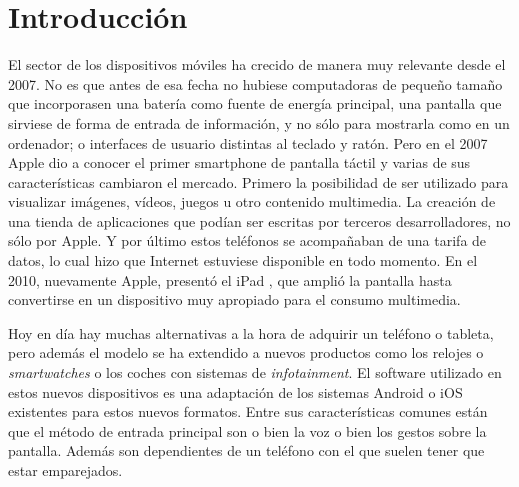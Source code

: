 \documentclass[
10pt, %
a4paper, %
oneside, %
headinclude,footinclude, %
BCOR5mm, %
]{scrartcl}
\begin{document}

{\let\thefootnote\relax{}}

{\let\thefootnote\relax{}}


\newpage %

\section{Introducción}
El sector de los dispositivos móviles ha crecido de manera muy relevante desde el 2007. No es que antes de esa fecha no hubiese computadoras de pequeño tamaño que incorporasen una batería como fuente de energía principal, una pantalla que sirviese de forma de entrada de información, y no sólo para mostrarla como en un ordenador; o interfaces de usuario distintas al teclado y ratón. Pero en el 2007 Apple dio a conocer el primer smartphone de pantalla táctil \cite{rob_price_how_2015} y varias de sus características cambiaron el mercado. Primero la posibilidad de ser utilizado para visualizar imágenes, vídeos, juegos u otro contenido multimedia. La creación de una tienda de aplicaciones que podían ser escritas por terceros desarrolladores, no sólo por Apple. Y por último estos teléfonos se acompañaban de una tarifa de datos, lo cual hizo que Internet estuviese disponible en todo momento. En el 2010, nuevamente Apple, presentó el iPad \cite{john_d._sutter_apple_2010}, que amplió la pantalla hasta convertirse en un dispositivo muy apropiado para el consumo multimedia.

Hoy en día hay muchas alternativas a la hora de adquirir un teléfono o tableta, pero además el modelo se ha extendido a nuevos productos como los relojes o \textit{smartwatches} o los coches con sistemas de \textit{infotainment}. El software utilizado en estos nuevos dispositivos es una adaptación de los sistemas Android o iOS existentes para estos nuevos formatos. Entre sus características comunes están que el método de entrada principal son o bien la voz o bien los gestos sobre la pantalla. Además son dependientes de un teléfono con el que suelen tener que estar emparejados.
\end{document}
